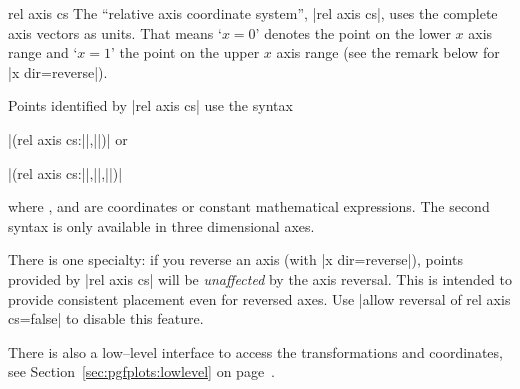 \begin{coordinatesystem}{rel axis cs}
The ``relative axis coordinate system'', |rel axis cs|, uses the complete axis vectors as units. That means `$x=0$' denotes the point on the lower $x$ axis range and `$x=1$' the point on the upper $x$ axis range (see the remark below for |x dir=reverse|).

\pgfplotsexpensiveexample
\begin{codeexample}[]
\end{codeexample}

\pgfplotsexpensiveexample
\begin{codeexample}[]
\end{codeexample}

	Points identified by |rel axis cs| use the syntax

		|(rel axis cs:||,||)| or

		|(rel axis cs:||,||,||)|
	
	\noindent where ,  and  are coordinates or constant mathematical expressions. The second syntax is only available in three dimensional axes.

	There is one specialty: if you reverse an axis (with |x dir=reverse|), points provided by |rel axis cs| will be \emph{unaffected} by the axis reversal. This is intended to provide consistent placement even for reversed axes. Use |allow reversal of rel axis cs=false| to disable this feature.

There is also a low--level interface to access the transformations and coordinates, see Section~\ref{sec:pgfplots:lowlevel} on page~\pageref{sec:pgfplots:lowlevel}.
\end{coordinatesystem}

